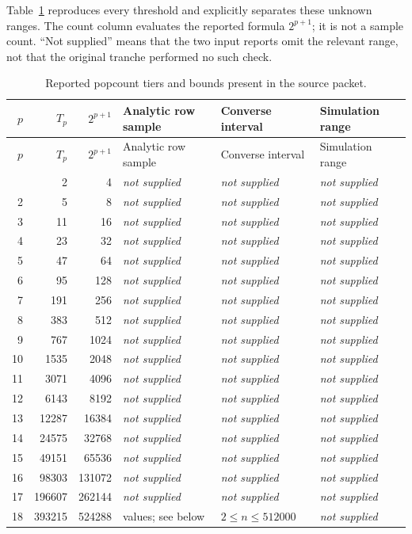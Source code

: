 \documentclass[11pt]{article}
\newcommand{\missing}{\textit{not supplied}}
\begin{document}
Table~\ref{tab:tiers} reproduces every threshold and explicitly separates
these unknown ranges. The count column evaluates the reported formula
$2^{p+1}$; it is not a sample count. ``Not supplied'' means that the two
input reports omit the relevant range, not that the original tranche
performed no such check.

\begingroup
\small
\setlength{\tabcolsep}{4pt}
\begin{longtable}{@{}rrr >{\raggedright\arraybackslash}p{2.35cm}
 >{\raggedright\arraybackslash}p{3.05cm}
 >{\raggedright\arraybackslash}p{2.15cm}@{}}
\caption{Reported popcount tiers and bounds present in the source packet.}
\label{tab:tiers}\\
\toprule
$p$ & $T_p$ & $2^{p+1}$ & Analytic row sample & Converse interval & Simulation range\\
\midrule
\endfirsthead
\toprule
$p$ & $T_p$ & $2^{p+1}$ & Analytic row sample & Converse interval & Simulation range\\
\midrule
\endhead
\bottomrule
\endfoot
1 & 2 & 4 & \missing & \missing & \missing\\
2 & 5 & 8 & \missing & \missing & \missing\\
3 & 11 & 16 & \missing & \missing & \missing\\
4 & 23 & 32 & \missing & \missing & \missing\\
5 & 47 & 64 & \missing & \missing & \missing\\
6 & 95 & 128 & \missing & \missing & \missing\\
7 & 191 & 256 & \missing & \missing & \missing\\
8 & 383 & 512 & \missing & \missing & \missing\\
9 & 767 & 1024 & \missing & \missing & \missing\\
10 & 1535 & 2048 & \missing & \missing & \missing\\
11 & 3071 & 4096 & \missing & \missing & \missing\\
12 & 6143 & 8192 & \missing & \missing & \missing\\
13 & 12287 & 16384 & \missing & \missing & \missing\\
14 & 24575 & 32768 & \missing & \missing & \missing\\
15 & 49151 & 65536 & \missing & \missing & \missing\\
16 & 98303 & 131072 & \missing & \missing & \missing\\
17 & 196607 & 262144 & \missing & \missing & \missing\\
18 & 393215 & 524288 & 19 values; see below & $2\leq n\leq512000$ & \missing\\
\end{longtable}
\endgroup
\end{document}
